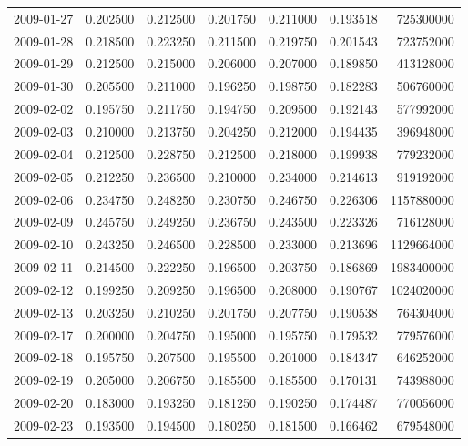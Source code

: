 \begin{tabular}{lrrrrrr}
2009-01-27 &    0.202500 &    0.212500 &    0.201750 &    0.211000 &    0.193518 &   725300000 \\
2009-01-28 &    0.218500 &    0.223250 &    0.211500 &    0.219750 &    0.201543 &   723752000 \\
2009-01-29 &    0.212500 &    0.215000 &    0.206000 &    0.207000 &    0.189850 &   413128000 \\
2009-01-30 &    0.205500 &    0.211000 &    0.196250 &    0.198750 &    0.182283 &   506760000 \\
2009-02-02 &    0.195750 &    0.211750 &    0.194750 &    0.209500 &    0.192143 &   577992000 \\
2009-02-03 &    0.210000 &    0.213750 &    0.204250 &    0.212000 &    0.194435 &   396948000 \\
2009-02-04 &    0.212500 &    0.228750 &    0.212500 &    0.218000 &    0.199938 &   779232000 \\
2009-02-05 &    0.212250 &    0.236500 &    0.210000 &    0.234000 &    0.214613 &   919192000 \\
2009-02-06 &    0.234750 &    0.248250 &    0.230750 &    0.246750 &    0.226306 &  1157880000 \\
2009-02-09 &    0.245750 &    0.249250 &    0.236750 &    0.243500 &    0.223326 &   716128000 \\
2009-02-10 &    0.243250 &    0.246500 &    0.228500 &    0.233000 &    0.213696 &  1129664000 \\
2009-02-11 &    0.214500 &    0.222250 &    0.196500 &    0.203750 &    0.186869 &  1983400000 \\
2009-02-12 &    0.199250 &    0.209250 &    0.196500 &    0.208000 &    0.190767 &  1024020000 \\
2009-02-13 &    0.203250 &    0.210250 &    0.201750 &    0.207750 &    0.190538 &   764304000 \\
2009-02-17 &    0.200000 &    0.204750 &    0.195000 &    0.195750 &    0.179532 &   779576000 \\
2009-02-18 &    0.195750 &    0.207500 &    0.195500 &    0.201000 &    0.184347 &   646252000 \\
2009-02-19 &    0.205000 &    0.206750 &    0.185500 &    0.185500 &    0.170131 &   743988000 \\
2009-02-20 &    0.183000 &    0.193250 &    0.181250 &    0.190250 &    0.174487 &   770056000 \\
2009-02-23 &    0.193500 &    0.194500 &    0.180250 &    0.181500 &    0.166462 &   679548000 \\

\end{tabular}
